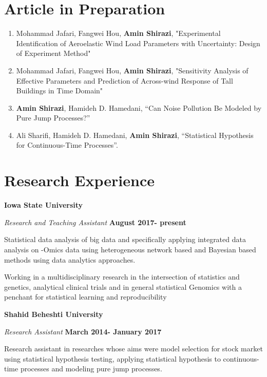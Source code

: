 \documentclass[margin,line]{res}
\begin{document}
\begin{resume}
\section{\sc Article in Preparation}
\begin{enumerate}
	\item 	Mohammad Jafari, Fangwei Hou, \textbf{Amin Shirazi}, "Experimental Identification of Aeroelastic Wind Load Parameters with Uncertainty: Design of Experiment Method"
	
	\item Mohammad Jafari, Fangwei Hou, \textbf{Amin Shirazi}, "Sensitivity Analysis of Effective Parameters and Prediction of Across-wind Response of Tall Buildings in Time Domain"
	
	\item \textbf{Amin Shirazi}, Hamideh D. Hamedani, “Can Noise Pollution Be Modeled by Pure Jump Processes?”
	
	\item Ali Sharifi, Hamideh D. Hamedani, \textbf{Amin Shirazi}, “Statistical Hypothesis for Continuous-Time Processes”. 
\end{enumerate}
\section{\sc Research Experience}
{\bf Iowa State University}

{\em Research and Teaching Assistant } \hfill {\bf August 2017- present}


\vspace{-.3cm}
Statistical data analysis of big data and specifically applying integrated data analysis on -Omics data using heterogeneous network based and Bayesian based methods using data analytics approaches.

\vspace{-.3cm}

Working in a multidisciplinary research in  the intersection of statistics and genetics, analytical clinical trials and in general statistical Genomics with a penchant for statistical learning and reproducibility



{\bf Shahid Beheshti University}

{\em Research Assistant } \hfill {\bf March 2014- January 2017}

\vspace{-.3cm}
Research assistant in researches whose aims were  model selection for stock market using statistical hypothesis testing, applying statistical hypothesis to continuous-time processes and modeling pure jump processes. 


\end{resume}
\end{document}
